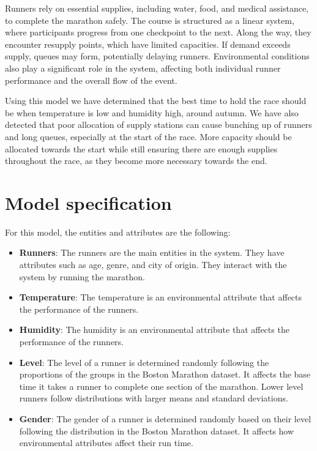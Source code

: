 \documentclass[conference]{IEEEtran}
\begin{document}
Runners rely on essential supplies, including water, food, and medical assistance, to complete the marathon safely. The course is structured as a linear system, where participants progress from one checkpoint to the next. Along the way, they encounter resupply points, which have limited capacities. If demand exceeds supply, queues may form, potentially delaying runners. Environmental conditions also play a significant role in the system, affecting both individual runner performance and the overall flow of the event.

Using this model we have determined that the best time to hold the race should be when temperature is low and humidity high, around autumn. We have also detected that poor allocation of supply stations can cause bunching up of runners and long queues, especially at the start of the race. More capacity should be allocated towards the start while still ensuring there are enough supplies throughout the race, as they become more necessary towards the end.

\section{Model specification}

For this model, the entities and attributes are the following:

\begin{itemize}
    \item \textbf{Runners}: The runners are the main entities in the system. They have attributes such as age, genre, and city of origin. They interact with the system by running the marathon.
    \item \textbf{Temperature}: The temperature is an environmental attribute that affects the performance of the runners.
    \item \textbf{Humidity}: The humidity is an environmental attribute that affects the performance of the runners.
    \item \textbf{Level}: The level of a runner is determined randomly following the proportions of the groups in the Boston Marathon dataset. It affects the base time it takes a runner to complete one section of the marathon. Lower level runners follow distributions with larger means and standard deviations.
    \item \textbf{Gender}: The gender of a runner is determined randomly based on their level following the distribution in the Boston Marathon dataset. It affects how environmental attributes affect their run time.
\end{itemize}
\end{document}
